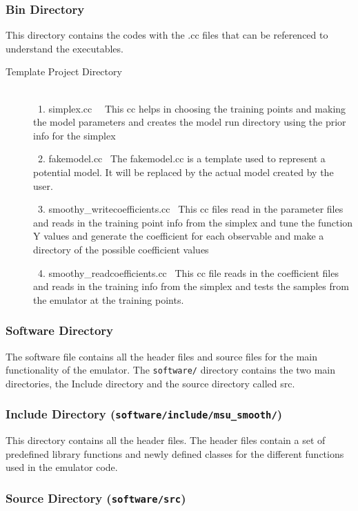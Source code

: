 \documentclass[12pt]{article}
\numberwithin{equation}{section}
\numberwithin{figure}{section}
\begin{document}
\subsubsection{Bin Directory}

This directory contains the codes with the .cc files that can be referenced to understand the executables.

\begin{description}
\item[Template Project Directory] \\
\ 1. simplex.cc \
\ This cc helps in choosing the training points and making the model parameters and creates the model run directory using the prior info for the simplex 

\ 2. fakemodel.cc 
\ The fakemodel.cc is a template used to represent a potential model. It will be replaced by the actual model created by the user. 

\ 3. smoothy\_writecoefficients.cc 
\ This cc files read in the parameter files and reads in the training point info from the simplex and tune the function Y values and generate the coefficient for each observable and make a directory of the possible coefficient values 

\ 4. smoothy\_readcoefficients.cc 
\ This cc file reads in the coefficient files and reads in the training info from the simplex and tests the samples from the emulator at the training points. 

\end{description}
\subsubsection{Software Directory}

The software file contains all the header files and source files for the main functionality of the emulator. The {\tt software/} directory contains the two main directories, the Include directory and the source directory called src.

\subsubsection{Include Directory ({\tt software/include/msu_smooth/})}

This directory contains all the header files. The header files contain a set of predefined library functions and newly defined classes for the different functions used in the emulator code. 

\subsubsection{Source Directory ({\tt software/src})}
\end{document}
